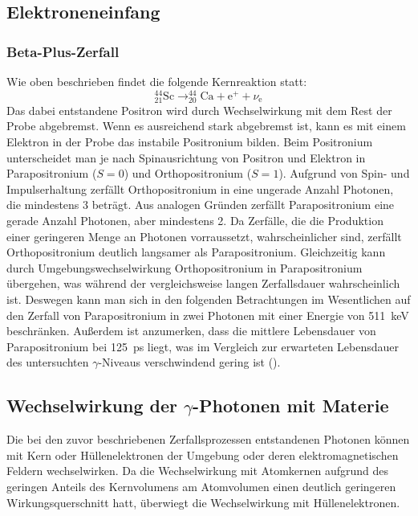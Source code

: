 \documentclass[
	a4paper,
	12pt,
	pagesize,
	ngerman
]{scrartcl}
\begin{document}
	\subsection{Elektroneneinfang}
	\subsubsection{Beta-Plus-Zerfall}
	Wie oben beschrieben findet die folgende Kernreaktion statt:
	\begin{equation}
		\label{eq_beta-plus}
		 _{21}^{44}\text{Sc} \rightarrow _{20}^{44}\text{Ca} + \text{e}^+ + \nu_{\text{e}}
	\end{equation}
	Das dabei entstandene Positron wird durch Wechselwirkung mit dem Rest der Probe abgebremst.
	Wenn es ausreichend stark abgebremst ist, kann es mit einem Elektron in der Probe das instabile Positronium bilden.
	Beim Positronium unterscheidet man je nach Spinausrichtung von Positron und Elektron in Parapositronium ($S=0$) und Orthopositronium ($S=1$).
	Aufgrund von Spin- und Impulserhaltung zerfällt Orthopositronium in eine ungerade Anzahl Photonen, die mindestens \num{3} beträgt.
	Aus analogen Gründen zerfällt Parapositronium eine gerade Anzahl Photonen, aber mindestens \num{2}.
	Da Zerfälle, die die Produktion einer geringeren Menge an Photonen vorraussetzt, wahrscheinlicher sind, zerfällt Orthopositronium deutlich langsamer als Parapositronium.
	Gleichzeitig kann durch Umgebungswechselwirkung Orthopositronium in Parapositronium übergehen, was während der vergleichsweise langen Zerfallsdauer wahrscheinlich ist.
	Deswegen kann man sich in den folgenden Betrachtungen im Wesentlichen auf den Zerfall von Parapositronium in zwei Photonen mit einer Energie von \SI{511}{keV} beschränken.
	Außerdem ist anzumerken, dass die mittlere Lebensdauer von Parapositronium bei \SI{125}{ps} liegt, was im Vergleich zur erwarteten Lebensdauer des untersuchten $\gamma$-Niveaus verschwindend gering ist (\cite{Anleitung}).

	\subsection{Wechselwirkung der $\gamma$-Photonen mit Materie}

	Die bei den zuvor beschriebenen Zerfallsprozessen entstandenen Photonen können mit Kern oder Hüllenelektronen der Umgebung oder deren elektromagnetischen Feldern wechselwirken.
	Da die Wechselwirkung mit Atomkernen aufgrund des geringen Anteils des Kernvolumens am Atomvolumen einen deutlich geringeren Wirkungsquerschnitt hatt, überwiegt die Wechselwirkung mit Hüllenelektronen.
\end{document}
